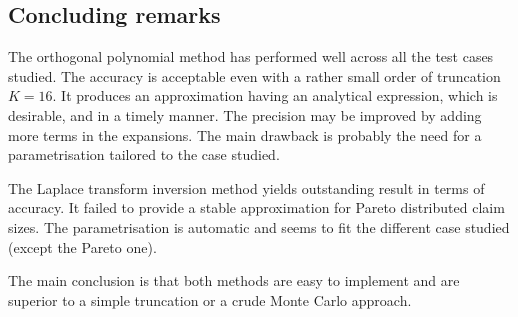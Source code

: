 \subsection{Concluding remarks}
The orthogonal polynomial method has performed well across all the test cases studied. The accuracy is acceptable even with a rather small order of truncation $K=16$. It produces an approximation having an analytical expression, which is desirable, and in a timely manner. The precision may be improved by adding more terms in the expansions. The main drawback is probably the need for a parametrisation tailored to the case studied.

The Laplace transform inversion method yields outstanding result in terms of accuracy. It failed to provide a stable approximation for Pareto distributed claim sizes. The parametrisation is automatic and seems to fit the different case studied (except the Pareto one).

The main conclusion is that both methods are easy to implement and are superior to a simple truncation or a crude Monte Carlo approach.